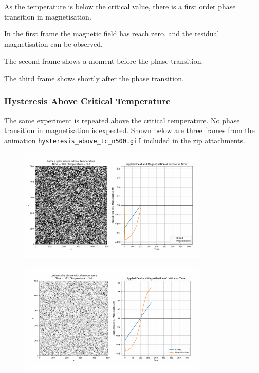 \documentclass[a4paper, 12pt]{article}
\begin{document}
As the temperature is below the critical value, there is a first order phase transition in magnetisation.

In the first frame the magnetic field has reach zero, and the residual magnetisation can be observed. 

The second frame shows a moment before the phase transition. 

The third frame shows shortly after the phase transition.

\newpage
\subsubsection{Hysteresis Above Critical Temperature}
The same experiment is repeated above the critical temperature. No phase transition in magnetisation is expected. Shown below are three frames from the animation \verb!hysteresis_above_tc_n500.gif! included in the zip attachments.

\begin{figure}[H]
	\centering
	\includegraphics[width=0.8\textwidth]{./resources/frames/hysteresis_above_tc_1.png}
\end{figure}

\begin{figure}[H]
	\centering
	\includegraphics[width=0.8\textwidth]{./resources/frames/hysteresis_above_tc_2.png}
\end{figure}
\end{document}
